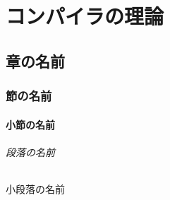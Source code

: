 \documentclass[uplatex]{ujbook}
\begin{document}
\part{コンパイラの理論}
\chapter{章の名前}
\section{節の名前}
\subsection{小節の名前}
\paragraph{段落の名前}
\subparagraph{小段落の名前}
\end{document}
